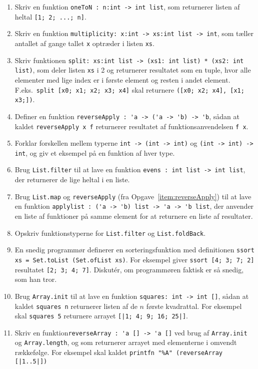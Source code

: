 \documentclass[a4paper,12pt]{article}
\begin{document}
\begin{enumerate}[label=5ø.\arabic*,start=0]
\item Skriv en funktion \lstinline{oneToN : n:int -> int list}, som returnerer listen af heltal \lstinline{[1; 2; ...; n]}.
\item Skriv en funktion \lstinline{multiplicity: x:int -> xs:int list -> int}, som tæller antallet af gange tallet \lstinline{x} optræder i listen \lstinline{xs}.
\item Skriv funktionen \lstinline{split: xs:int list -> (xs1: int list) * (xs2: int list)}, som deler listen \lstinline{xs} i 2 og returnerer resultatet som en tuple, hvor alle elementer med lige index er i første element og resten i andet element. F.eks.\ \mbox{\lstinline{split [x0; x1; x2; x3; x4]}} skal returnere \mbox{\lstinline{([x0; x2; x4], [x1; x3;])}}.
\item \label{item:reverseApply} Definer en funktion \lstinline{reverseApply : 'a -> ('a -> 'b) -> 'b}, sådan at kaldet \mbox{\lstinline{reverseApply x f}} returnerer resultatet af funktionsanvendelsen \lstinline{f x}.
\item Forklar forskellen mellem typerne \lstinline{int -> (int -> int)} og \lstinline{(int -> int) -> int}, og giv et eksempel på en funktion af hver type.
\item Brug \lstinline{List.filter} til at lave en funktion \lstinline{evens : int list -> int list}, der returnerer de lige heltal i en liste.
\item Brug \lstinline{List.map} og \lstinline{reverseApply} (fra Opgave~\ref{item:reverseApply}) til at lave en funktion \lstinline{applylist : ('a -> 'b) list -> 'a -> 'b list}, der anvender en liste af funktioner på samme element for at returnere en liste af resultater.
\item Opskriv funktionstyperne for \lstinline{List.filter} og \lstinline{List.foldBack}.
\item En snedig programmør definerer en sorteringsfunktion med definitionen \lstinline{ssort xs = Set.toList (Set.ofList xs)}. For eksempel giver \lstinline{ssort [4; 3; 7; 2]} resultatet \lstinline{[2; 3; 4; 7]}.  Diskut\'{e}r, om programmøren faktisk er så snedig, som han tror.
\item Brug \lstinline{Array.init} til at lave en funktion \lstinline{squares: int -> int []}, sådan at kaldet \lstinline{squares n} returnerer listen af de $n$ første kvadrattal.  For eksempel skal \lstinline{squares 5} returnere arrayet \lstinline{[|1; 4; 9; 16; 25|]}.
\item Skriv en funktion\mbox{\lstinline{reverseArray : 'a [] -> 'a []}} ved brug af \lstinline{Array.init} og \lstinline{Array.length}, og som returnerer arrayet med elementerne i omvendt rækkefølge.  For eksempel skal kaldet \lstinline{printfn "%A" (reverseArray [|1..5|])} %

\end{enumerate}
\end{document}
